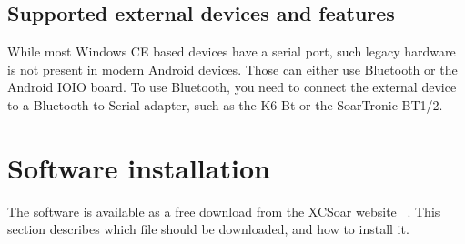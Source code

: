 \subsection*{Supported external devices and features}
\label{sec:supported-varios}

\newcommand{\y}[0]{{ $\surd$ }}
\noindent{}

While most Windows CE based devices have a serial port, such legacy
hardware is not present in modern Android devices.  Those can either
use Bluetooth or the Android IOIO board.  To use Bluetooth, you need
to connect the external device to a Bluetooth-to-Serial adapter, such
as the K6-Bt or the SoarTronic-BT1/2. %


\section{Software installation}

The software is available as a free download from the XCSoar website
~\xcsoarwebsite{}.  This section describes which file should be
downloaded, and how to install it.

